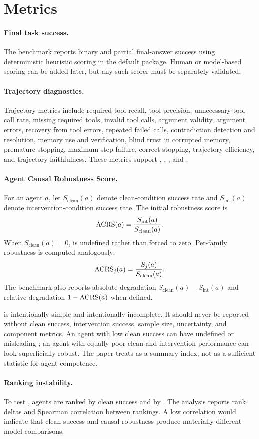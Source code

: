 \section{Metrics}

\paragraph{Final task success.}
The benchmark reports binary and partial final-answer success using deterministic heuristic scoring in the default package. Human or model-based scoring can be added later, but any such scorer must be separately validated.

\paragraph{Trajectory diagnostics.}
Trajectory metrics include required-tool recall, tool precision, unnecessary-tool-call rate, missing required tools, invalid tool calls, argument validity, argument errors, recovery from tool errors, repeated failed calls, contradiction detection and resolution, memory use and verification, blind trust in corrupted memory, premature stopping, maximum-step failure, correct stopping, trajectory efficiency, and trajectory faithfulness. These metrics support , , , and .

\paragraph{Agent Causal Robustness Score.}
For an agent $a$, let $S_{\mathrm{clean}}(a)$ denote clean-condition success rate and $S_{\mathrm{int}}(a)$ denote intervention-condition success rate. The initial robustness score is
\[
\mathrm{ACRS}(a) = \frac{S_{\mathrm{int}}(a)}{S_{\mathrm{clean}}(a)}.
\]
When $S_{\mathrm{clean}}(a)=0$, \acrs is undefined rather than forced to zero. Per-family robustness is computed analogously:
\[
\mathrm{ACRS}_j(a) = \frac{S_j(a)}{S_{\mathrm{clean}}(a)}.
\]
The benchmark also reports absolute degradation $S_{\mathrm{clean}}(a)-S_{\mathrm{int}}(a)$ and relative degradation $1-\mathrm{ACRS}(a)$ when defined.

\acrs is intentionally simple and intentionally incomplete. It should never be reported without clean success, intervention success, sample size, uncertainty, and component metrics. An agent with low clean success can have undefined or misleading \acrs; an agent with equally poor clean and intervention performance can look superficially robust. The paper treats \acrs as a summary index, not as a sufficient statistic for agent competence.

\paragraph{Ranking instability.}
To test , agents are ranked by clean success and by \acrs. The analysis reports rank deltas and Spearman correlation between rankings. A low correlation would indicate that clean success and causal robustness produce materially different model comparisons.

